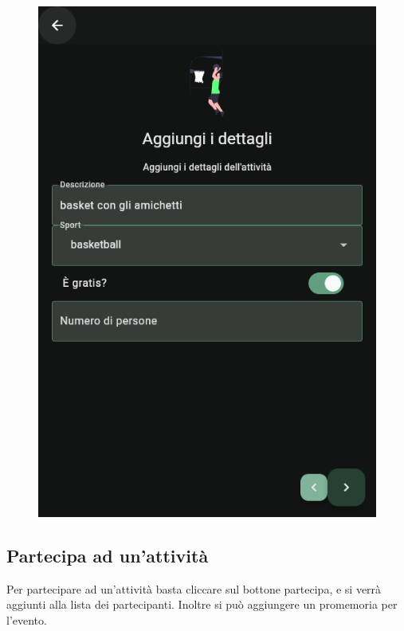 \documentclass[a4paper,12pt]{article}
\begin{document}
\begin{figure}[H]
\begin{minipage}{0.32\textwidth}
        \includegraphics[width=1\linewidth]{img/new_desc.png}
    \end{minipage}
\end{figure}

\subsection{Partecipa ad un'attività}

Per partecipare ad un'attività basta cliccare sul bottone partecipa, e si verrà aggiunti alla lista dei partecipanti. Inoltre si può aggiungere un promemoria per l'evento.
\end{document}
